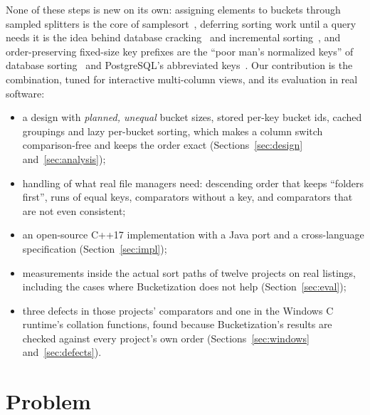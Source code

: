 \documentclass[11pt]{article}
\theoremstyle{definition}
\begin{document}
None of these steps is new on its own: assigning elements to buckets through
sampled splitters is the core of samplesort~\cite{frazer1970samplesort,
sanders2004superscalar}, deferring sorting work until a query needs it is the
idea behind database cracking~\cite{idreos2007cracking} and incremental
sorting~\cite{paredes2006incremental}, and order-preserving fixed-size key
prefixes are the ``poor man's normalized keys'' of database
sorting~\cite{graefe2006sorting} and PostgreSQL's abbreviated
keys~\cite{postgres95}. Our contribution is the combination, tuned for
interactive multi-column views, and its evaluation in real software:
\begin{itemize}
\item a design with \emph{planned, unequal} bucket sizes, stored per-key bucket
  ids, cached groupings and lazy per-bucket sorting, which makes a column
  switch comparison-free and keeps the order exact
  (Sections~\ref{sec:design} and~\ref{sec:analysis});
\item handling of what real file managers need: descending order that keeps
  ``folders first'', runs of equal keys, comparators without a key, and
  comparators that are not even consistent;
\item an open-source C++17 implementation with a Java port and a cross-language
  specification (Section~\ref{sec:impl});
\item measurements inside the actual sort paths of twelve projects on real
  listings, including the cases where Bucketization does not help
  (Section~\ref{sec:eval});
\item three defects in those projects' comparators and one in the Windows C
  runtime's collation functions, found because
  Bucketization's results are checked against every project's own order
  (Sections~\ref{sec:windows} and~\ref{sec:defects}).
\end{itemize}

\section{Problem}\label{sec:problem}
\end{document}

